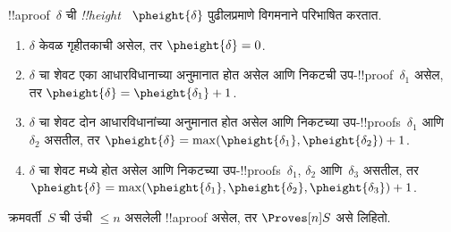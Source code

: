 \documentclass[../../../include/open-logic-section]{subfiles}
\begin{document}


\begin{defn}
!!a{proof}~$\delta$ ची
\emph{!!{height}}~
$\pheight{\delta}$
पुढीलप्रमाणे विगमनाने
परिभाषित करतात.
\begin{enumerate}
  \item $\delta$ केवळ
  गृहीतकाची असेल, तर
  $\pheight{\delta} = 0$.
  \item $\delta$ चा शेवट
  एका आधारविधानाच्या
  अनुमानात होत असेल
  आणि निकटची
  उप-!!{proof}~$\delta_1$
  असेल, तर
  $\pheight{\delta} =
  \pheight{\delta_1} + 1$.
  \item $\delta$ चा शेवट
  दोन आधारविधानांच्या
  अनुमानात होत असेल
  आणि निकटच्या
  उप-!!{proof}s~$\delta_1$
  आणि~$\delta_2$ असतील,
  तर $\pheight{\delta} =
  \max(\pheight{\delta_1},
  \pheight{\delta_2}) + 1$.
  \item $\delta$ चा शेवट
  \Elim{\lor} मध्ये होत
  असेल आणि निकटच्या
  उप-!!{proof}s~$\delta_1$,
  $\delta_2$ आणि~$\delta_3$
  असतील, तर
  $\pheight{\delta} =
  \max(\pheight{\delta_1},
  \pheight{\delta_2},
  \pheight{\delta_3}) + 1$.
\end{enumerate}
क्रमवर्ती~$S$ ची उंची
$\le n$ असलेली
!!a{proof} असेल,
तर $ \Proves[n] S$
असे लिहितो.
\end{defn}
\end{document}
